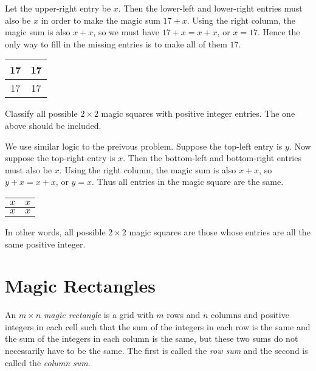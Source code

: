 \documentclass[11pt]{article}
\renewenvironment{problem}{\begin{problems}}{\end{problems}\vspace{5pt}}
\begin{document}
\begin{solution}
Let the upper-right entry be $x$. Then the lower-left and lower-right entries must also be $x$ in order
to make the magic sum $17+x$. Using the right column, the magic sum is also $x+x$, so we must have
$17+x = x+x$, or $x = 17$. Hence the only way to fill in the missing entries is to make all of them $17$.

\begin{center}
\begin{tabular}{|c|c|}
\hline
17 & 17 \\ \hline
17 & 17 \\ \hline
\end{tabular}
\end{center}
\end{solution}

\begin{problem}[4 points]
Classify all possible $2 \times 2$ magic squares with positive integer entries. The one above should be included.
\end{problem}

\begin{solution}
We use similar logic to the preivous problem. Suppose the top-left entry is $y$. 
Now suppose the top-right entry is $x$. Then the bottom-left and bottom-right entries must also be $x$.
Using the right column, the magic sum is also $x+x$, so $y+x = x+x$, or $y = x$.
Thus all entries in the magic square are the same.

\begin{center}
\begin{tabular}{|c|c|}
\hline
$x$ & $x$ \\ \hline
$x$ & $x$ \\ \hline
\end{tabular}
\end{center}

In other words, all possible $2 \times 2$ magic squares are those whose entries are all the same positive integer.
\end{solution}

\section{Magic Rectangles}

\begin{definition}
An $m \times n$ \textit{magic rectangle} is a grid with $m$ rows and $n$ columns and positive integers in each cell such that
the sum of the integers in each row is the same and the sum of the integers in each column is the same,
but these two sums do not necessarily have to be the same.
The first is called the \textit{row sum} and the second is called the \textit{column sum}.
\end{definition}
\end{document}
